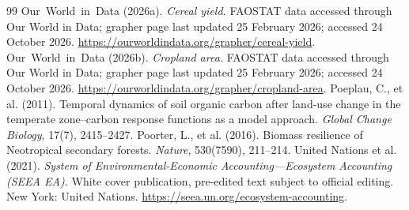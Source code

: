 \documentclass[11pt,a4paper]{article}
\begin{document}
\begin{thebibliography}{99}
 Our~World~in~Data (2026a). \emph{Cereal yield.} FAOSTAT data accessed through Our World in Data; grapher page last updated 25 February 2026; accessed 24 October 2026. \url{https://ourworldindata.org/grapher/cereal-yield}.
 Our~World~in~Data (2026b). \emph{Cropland area.} FAOSTAT data accessed through Our World in Data; grapher page last updated 25 February 2026; accessed 24 October 2026. \url{https://ourworldindata.org/grapher/cropland-area}.
 Poeplau, C., et al. (2011). Temporal dynamics of soil organic carbon after land-use change in the temperate zone--carbon response functions as a model approach. \emph{Global Change Biology}, 17(7), 2415--2427.
 Poorter, L., et al. (2016). Biomass resilience of Neotropical secondary forests. \emph{Nature}, 530(7590), 211--214.
 United Nations et al. (2021). \emph{System of Environmental-Economic Accounting---Ecosystem Accounting (SEEA EA).} White cover publication, pre-edited text subject to official editing. New York: United Nations. \url{https://seea.un.org/ecosystem-accounting}.
\end{thebibliography}
\end{document}
